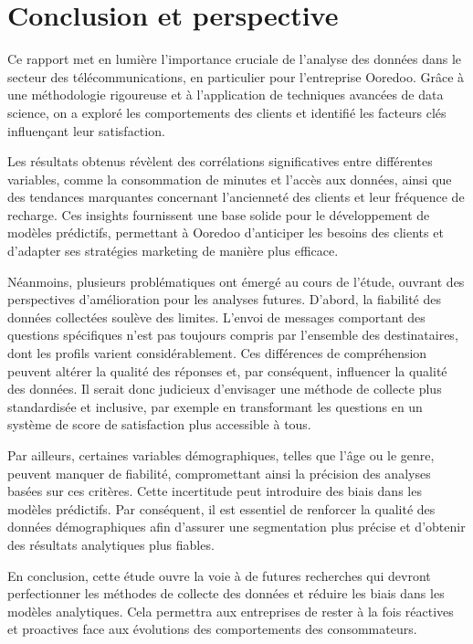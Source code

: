 \chapter*{Conclusion et perspective}
\adjustmtc
\thispagestyle{MyStyle}

\justifying

\sloppy {} 

Ce rapport met en lumière l'importance cruciale de l'analyse des données dans le secteur des télécommunications, en particulier pour l'entreprise Ooredoo. Grâce à une méthodologie rigoureuse et à l'application de techniques avancées de data science, on a exploré les comportements des clients et identifié les facteurs clés influençant leur satisfaction.

Les résultats obtenus révèlent des corrélations significatives entre différentes variables, comme la consommation de minutes et l'accès aux données, ainsi que des tendances marquantes concernant l'ancienneté des clients et leur fréquence de recharge. Ces insights fournissent une base solide pour le développement de modèles prédictifs, permettant à Ooredoo d'anticiper les besoins des clients et d'adapter ses stratégies marketing de manière plus efficace.

Néanmoins, plusieurs problématiques ont émergé au cours de l'étude, ouvrant des perspectives d'amélioration pour les analyses futures. D'abord, la fiabilité des données collectées soulève des limites. L'envoi de messages comportant des questions spécifiques n'est pas toujours compris par l'ensemble des destinataires, dont les profils varient considérablement. Ces différences de compréhension peuvent altérer la qualité des réponses et, par conséquent, influencer la qualité des données. Il serait donc judicieux d'envisager une méthode de collecte plus standardisée et inclusive, par exemple en transformant les questions en un système de score de satisfaction plus accessible à tous.

Par ailleurs, certaines variables démographiques, telles que l'âge ou le genre, peuvent manquer de fiabilité, compromettant ainsi la précision des analyses basées sur ces critères. Cette incertitude peut introduire des biais dans les modèles prédictifs. Par conséquent, il est essentiel de renforcer la qualité des données démographiques afin d'assurer une segmentation plus précise et d'obtenir des résultats analytiques plus fiables.

En conclusion, cette étude ouvre la voie à de futures recherches qui devront perfectionner les méthodes de collecte des données et réduire les biais dans les modèles analytiques. Cela permettra aux entreprises de rester à la fois réactives et proactives face aux évolutions des comportements des consommateurs.
